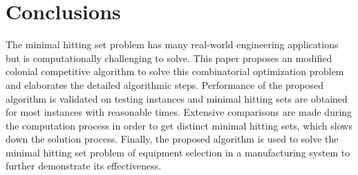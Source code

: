 \section{Conclusions}
The minimal hitting set problem has many real-world engineering applications but is computationally challenging to solve.
This paper proposes an modified colonial competitive algorithm to solve this combinatorial optimization problem and elaborates the detailed algorithmic steps.
Performance of the proposed algorithm is validated on testing instances and minimal hitting sets are obtained for most instances with reasonable times.
Extensive comparisons are made during the computation process in order to get distinct minimal hitting sets, which slows down the solution process.
Finally, the proposed algorithm is used to solve the minimal hitting set problem of equipment selection in a manufacturing system to further demonstrate its effectiveness.

